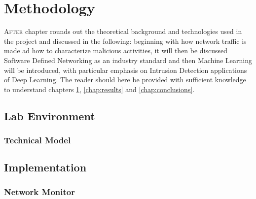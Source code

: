 \chapter{Methodology}
\label{chap:methodology}

\lettrine[lines=3, findent=3pt, nindent=0pt]{A}{fter} chapter rounds out the theoretical background and technologies used in the project and discussed in the following: beginning with how network traffic is made ad how to characterize malicious activities, it will then be discussed Software Defined Networking as an industry standard and then Machine Learning will be introduced, with particular emphasis on Intrusion Detection applications of Deep Learning. The reader should here be provided with sufficient knowledge to understand chapters \ref{chap:methodology}, \ref{chap:results} and \ref{chap:conclusions}.


\section{Lab Environment}
\label{sec:environment}

\textcolor{dimgray}{\lipsum}


\subsection{Technical Model}
\label{subsec:technical-model}

\textcolor{dimgray}{\lipsum}


\section{Implementation}
\label{sec:implemntation}

\textcolor{dimgray}{\lipsum}


\subsection{Network Monitor}
\label{subsec:monitor-implementation}

